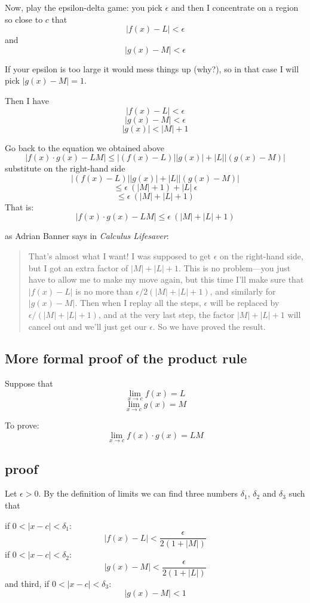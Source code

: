 \documentclass[11pt, oneside]{article}
\begin{document}
Now, play the epsilon-delta game:  you pick $\epsilon$ and then I concentrate on a region so close to $c$ that
\[ |f(x) - L | < \epsilon \]
and
\[ |g(x) - M | < \epsilon \]

If your epsilon is too large it would mess things up (why?), so in that case I will pick $|g(x) - M| = 1$.

Then I have
\[ |f(x) - L | < \epsilon \]
\[ |g(x) - M | < \epsilon \]
\[ |g(x)| < |M| + 1 \]

Go back to the equation we obtained above
\[ |f(x) \cdot g(x) - LM| \le |(f(x) - L) | | g(x)| + | L | | (g(x) - M )| \]
substitute on the right-hand side
\[ |(f(x) - L) | | g(x)| + | L | | (g(x) - M )| \]
\[ \le \epsilon \ (|M| + 1) + | L | \ \epsilon \]
\[ \le \epsilon \ (|M| + |L| + 1) \]
That is:
\[ |f(x) \cdot g(x) - LM| \le \epsilon \ (|M| + |L| + 1) \]

as Adrian Banner says in \emph{Calculus Lifesaver}:

\begin{quote}
That's almost what I want!  I was supposed to get $\epsilon$ on the right-hand side, but I got an extra factor of $|M| + |L| + 1$.  This is no problem---you just have to allow me to make my move again, but this time I'll make sure that $|f(x) - L|$ is no more than $\epsilon/2(|M| + |L| + 1)$, and similarly for $|g(x) - M|$.  Then when I replay all the steps, $\epsilon$ will be replaced by $\epsilon/(|M| + |L| + 1)$, and at the very last step, the factor $|M| + |L| + 1$ will cancel out and we'll just get our $\epsilon$.  So we have proved the result.
\end{quote}

\subsection*{More formal proof of the product rule}

Suppose that 
\[ \lim_{x \rightarrow c} f(x) = L \]
\[ \lim_{x \rightarrow c} g(x) = M \]

To prove:
\[ \lim_{x \rightarrow c} f(x) \cdot g(x) = LM \]

\subsection*{proof}
Let $\epsilon > 0$.  By the definition of limits we can find three numbers $\delta_1$, $\delta_2$ and $\delta_3$ such that

if $0 < |x - c| < \delta_1$:
\[ |f(x) - L| < \frac{\epsilon}{2(1 + |M|)} \]
if $0 < |x - c| < \delta_2$:
\[ |g(x) - M| < \frac{\epsilon}{2(1 + |L|)} \]
and third, if $0 < |x - c| < \delta_3$:
\[ |g(x) - M| < 1 \]
\end{document}
